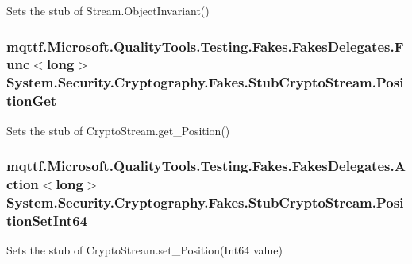 Sets the stub of Stream.\-Object\-Invariant()

\hypertarget{class_system_1_1_security_1_1_cryptography_1_1_fakes_1_1_stub_crypto_stream_a2218d61f842a8f93e5f5b1b981657077}{
\subsubsection[{Position\-Get}]{\setlength{\rightskip}{0pt plus 5cm}mqttf.\-Microsoft.\-Quality\-Tools.\-Testing.\-Fakes.\-Fakes\-Delegates.\-Func$<$long$>$ System.\-Security.\-Cryptography.\-Fakes.\-Stub\-Crypto\-Stream.\-Position\-Get}}\label{class_system_1_1_security_1_1_cryptography_1_1_fakes_1_1_stub_crypto_stream_a2218d61f842a8f93e5f5b1b981657077}


Sets the stub of Crypto\-Stream.\-get\-\_\-\-Position()

\hypertarget{class_system_1_1_security_1_1_cryptography_1_1_fakes_1_1_stub_crypto_stream_ac7d0fe7c1971ea534a218f522de4a76d}{
\subsubsection[{Position\-Set\-Int64}]{\setlength{\rightskip}{0pt plus 5cm}mqttf.\-Microsoft.\-Quality\-Tools.\-Testing.\-Fakes.\-Fakes\-Delegates.\-Action$<$long$>$ System.\-Security.\-Cryptography.\-Fakes.\-Stub\-Crypto\-Stream.\-Position\-Set\-Int64}}\label{class_system_1_1_security_1_1_cryptography_1_1_fakes_1_1_stub_crypto_stream_ac7d0fe7c1971ea534a218f522de4a76d}


Sets the stub of Crypto\-Stream.\-set\-\_\-\-Position(\-Int64 value)


